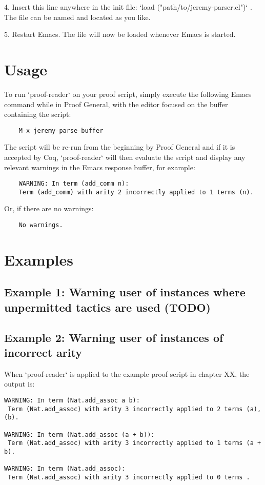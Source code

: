 4. Insert this line anywhere in the init file: `load ("path/to/jeremy-parser.el")` . The file can be named and located as you like.

5. Restart Emacs. The file will now be loaded whenever Emacs is started.

\section{Usage}
To run `proof-reader` on your proof script, simply execute the following Emacs command while in Proof General, with the editor focused on the buffer containing the script:
\begin{lstlisting}
    M-x jeremy-parse-buffer
\end{lstlisting}

The script will be re-run from the beginning by Proof General and if it is accepted by Coq, `proof-reader` will then evaluate the script and display any relevant warnings in the Emacs response buffer, for example:
\begin{lstlisting}
    WARNING: In term (add_comm n):
    Term (add_comm) with arity 2 incorrectly applied to 1 terms (n).
\end{lstlisting}
Or, if there are no warnings:
\begin{lstlisting}
    No warnings.
\end{lstlisting}


\section{Examples}

\subsection{Example 1: Warning user of instances where unpermitted tactics are used (TODO)}

\subsection{Example 2: Warning user of instances of incorrect arity}
When `proof-reader` is applied to the example proof script in chapter XX, the output is:

\begin{lstlisting}
WARNING: In term (Nat.add_assoc a b):
 Term (Nat.add_assoc) with arity 3 incorrectly applied to 2 terms (a),(b).

WARNING: In term (Nat.add_assoc (a + b)):
 Term (Nat.add_assoc) with arity 3 incorrectly applied to 1 terms (a + b).
 
WARNING: In term (Nat.add_assoc):
 Term (Nat.add_assoc) with arity 3 incorrectly applied to 0 terms .
\end{lstlisting}

